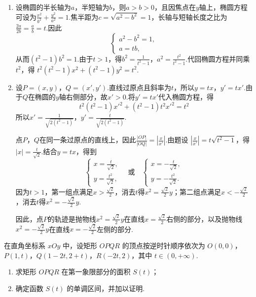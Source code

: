 \begin{solution}
\begin{enumerate}
\item 设椭圆的半长轴为\(a\)，半短轴为\(b\)，则\(a>b>0\)，且因焦点在\(y\)轴上，椭圆方程可设为\(\frac{x^2}{b^2}+\frac{y^2}{a^2}=1\).焦半距为\(c=\sqrt{a^2-b^2}=1\)，长轴与短轴长度之比为\(\frac{2a}{2b}=\frac{a}{b}=t\).因此
\[
\begin{cases}
a^2-b^2=1,\\
a=tb,
\end{cases}
\]
从而\((t^2-1)b^2=1\).由于\(t>1\)，得\(b^2=\frac{1}{t^2-1}\)，\(a^2=\frac{t^2}{t^2-1}\).代回椭圆方程并同乘\(t^2\)，得
\(t^2(t^2-1)x^2+(t^2-1)y^2=t^2\).

\item 设\(P=(x,y)\)，\(Q=(x',y')\).直线过原点且斜率为\(t\)，所以\(y=tx\)，\(y'=tx'\).由于\(Q\)在椭圆的\(y\)轴右侧部分，故\(x'>0\).将\(y'=tx'\)代入椭圆方程，得
\[
t^2(t^2-1)x'^2+(t^2-1)t^2x'^2=t^2
\]
所以\(x'=\frac{1}{\sqrt{2(t^2-1)}}\)，\(y'=\frac{t}{\sqrt{2(t^2-1)}}\).

点\(P\)，\(Q\)在同一条过原点的直线上，因此\(\frac{|OP|}{|OQ|}=\left|\frac{x}{x'}\right|\).由题设
\(\left|\frac{x}{x'}\right|=t\sqrt{t^2-1}\)，得\(|x|=\frac{t}{\sqrt2}\).结合\(y=tx\)，得到
\[
\begin{cases}
x=\frac{t}{\sqrt2},\\
y=\frac{t^2}{\sqrt2},
\end{cases}
\quad\text{或}\quad
\begin{cases}
x=-\frac{t}{\sqrt2},\\
y=-\frac{t^2}{\sqrt2}.
\end{cases}
\]
因为\(t>1\)，第一组点满足\(x>\frac{\sqrt2}{2}\)，消去\(t\)得\(x^2=\frac{\sqrt2}{2}y\)；第二组点满足\(x< -\frac{\sqrt2}{2}\)，消去\(t\)得\(x^2=-\frac{\sqrt2}{2}y\).

因此，点\(P\)的轨迹是抛物线\(x^2=\frac{\sqrt2}{2}y\)在直线\(x=\frac{\sqrt2}{2}\)右侧的部分，以及抛物线\(x^2=-\frac{\sqrt2}{2}y\)在直线\(x=-\frac{\sqrt2}{2}\)左侧的部分.
\end{enumerate}
\end{solution}

\begin{problem}
在直角坐标系 \(xOy\) 中，设矩形 \(OPQR\) 的顶点按逆时针顺序依次为 \(O(0,0)\)，\(P(1,t)\)，\(Q(1-2t,2+t)\)，\(R(-2t,2)\)，其中 \(t \in (0,+\infty)\).
\begin{enumerate}
\item 求矩形 \(OPQR\) 在第一象限部分的面积 \(S(t)\)；
\item 确定函数 \(S(t)\) 的单调区间，并加以证明.
\end{enumerate}
\end{problem}

